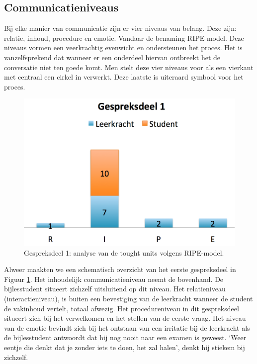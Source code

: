 \documentclass[a4paper,12pt]{article}
\theoremstyle{definition}
\begin{document}
\subsection{Communicatieniveaus}
Bij elke manier van communicatie zijn er vier niveaus van belang. Deze zijn: relatie, inhoud, 
procedure en emotie. Vandaar de benaming RIPE-model. Deze niveaus vormen een 
veerkrachtig evenwicht en ondersteunen het proces. Het is vanzelfsprekend dat wanneer er een 
onderdeel hiervan ontbreekt het de conversatie niet ten goede komt. Men stelt deze vier niveaus voor 
als een vierkant met centraal een cirkel in verwerkt. Deze laatste is uiteraard symbool voor het proces. 
\begin{figure}[h]
  \centering
  \includegraphics[scale=0.6]{grafiek5.png}\caption{Gespreksdeel 1: analyse van 
de tought units volgens RIPE-model.}\label{5}
\end{figure}
Alweer maakten we een schematisch overzicht van het eerste gespreksdeel in 
Figuur \ref{5}. Het inhoudelijk communicatieniveau neemt de bovenhand. De 
bijlesstudent situeert zichzelf uitsluitend op dit niveau. Het relatieniveau (interactieniveau), is 
buiten een bevestiging van de leerkracht wanneer de student de vakinhoud 
vertelt, totaal afwezig. Het procedureniveau in dit gespreksdeel situeert zich 
bij het verwelkomen en het stellen van de eerste vraag. Het niveau van de emotie bevindt zich bij het ontstaan
van een irritatie bij de leerkracht als de bijlesstudent antwoordt dat hij nog nooit naar een examen is geweest. `Weer eentje
die denkt dat je zonder iets te doen, het zal halen', denkt hij stiekem bij zichzelf. \\
\end{document}
